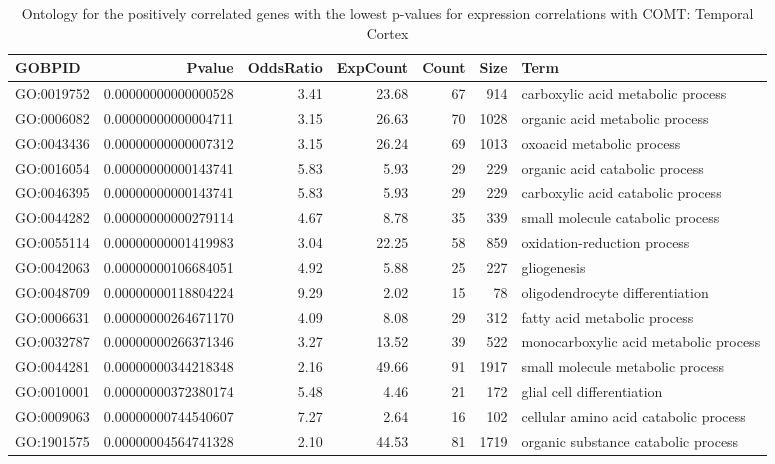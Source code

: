 \documentclass[letterpaper,12pt]{article}
\numberwithin{equation}{appendix}
\begin{document}
\noindent

\begin{landscape}

{\footnotesize {
\setlength\LTleft{-1cm}
\setlength\LTright{-1cm}
\begin{longtable}{lrrrrrl}
\caption{Ontology for the positively correlated genes with the lowest p-values for expression correlations with COMT: Temporal Cortex} \\ 
  \toprule
GOBPID & Pvalue & OddsRatio & ExpCount & Count & Size & Term \\ 
  \midrule
GO:0019752 & 0.00000000000000528 & 3.41 & 23.68 & 67 & 914 & carboxylic acid metabolic process \\ 
  GO:0006082 & 0.00000000000004711 & 3.15 & 26.63 & 70 & 1028 & organic acid metabolic process \\ 
  GO:0043436 & 0.00000000000007312 & 3.15 & 26.24 & 69 & 1013 & oxoacid metabolic process \\ 
  GO:0016054 & 0.00000000000143741 & 5.83 & 5.93 & 29 & 229 & organic acid catabolic process \\ 
  GO:0046395 & 0.00000000000143741 & 5.83 & 5.93 & 29 & 229 & carboxylic acid catabolic process \\ 
  GO:0044282 & 0.00000000000279114 & 4.67 & 8.78 & 35 & 339 & small molecule catabolic process \\ 
  GO:0055114 & 0.00000000001419983 & 3.04 & 22.25 & 58 & 859 & oxidation-reduction process \\ 
  GO:0042063 & 0.00000000106684051 & 4.92 & 5.88 & 25 & 227 & gliogenesis \\ 
  GO:0048709 & 0.00000000118804224 & 9.29 & 2.02 & 15 & 78 & oligodendrocyte differentiation \\ 
  GO:0006631 & 0.00000000264671170 & 4.09 & 8.08 & 29 & 312 & fatty acid metabolic process \\ 
  GO:0032787 & 0.00000000266371346 & 3.27 & 13.52 & 39 & 522 & monocarboxylic acid metabolic process \\ 
  GO:0044281 & 0.00000000344218348 & 2.16 & 49.66 & 91 & 1917 & small molecule metabolic process \\ 
  GO:0010001 & 0.00000000372380174 & 5.48 & 4.46 & 21 & 172 & glial cell differentiation \\ 
  GO:0009063 & 0.00000000744540607 & 7.27 & 2.64 & 16 & 102 & cellular amino acid catabolic process \\ 
  GO:1901575 & 0.00000004564741328 & 2.10 & 44.53 & 81 & 1719 & organic substance catabolic process \\ 

\end{longtable}}}
\end{landscape}
\end{document}
